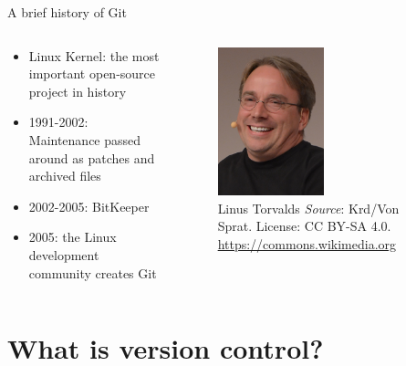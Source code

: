 \documentclass[handout]{beamer}
\begin{document}
\begin{frame}{A brief history of Git}
\begin{columns}
  \begin{column}{0.5\textwidth}

    \begin{itemize}
      \item Linux Kernel: the most important open-source project in history
      \item 1991-2002: Maintenance passed around as patches and archived files
      \item 2002-2005: BitKeeper
      \item 2005: the Linux development community creates Git
    \end{itemize}

  \end{column}
  \begin{column}{0.5\textwidth}
  
  \begin{figure}
	  \includegraphics[width=0.5\textwidth]{figures/linus.jpg}
	  \caption{Linus Torvalds \textit{Source}: Krd/Von Sprat. License: CC BY-SA 4.0. \href{https://commons.wikimedia.org/wiki/File:LinuxCon_Europe_Linus_Torvalds_03.jpg}{https://commons.wikimedia.org}}
  \end{figure}  
    
  \end{column}
\end{columns}

\end{frame}

\section{What is version control?}
\end{document}
